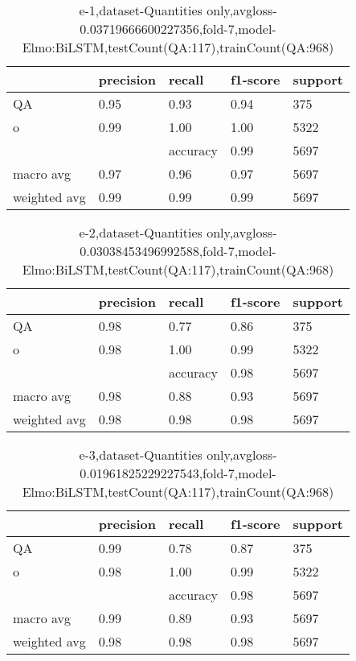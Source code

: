 \begin{table}[!ht] 
\centering
\caption{e-1,dataset-Quantities only,avgloss-0.03719666600227356,fold-7,model-Elmo:BiLSTM,testCount(QA:117),trainCount(QA:968)}\label{e-1data-quantS.tsv}
\begin{tabularx}{300pt}{|X|X|X|X|X|}
\hline
&precision&recall&f1-score&support\\
\hline
QA&0.95&0.93&0.94&375\\
\hline
o&0.99&1.00&1.00&5322\\
\hline
&&accuracy&0.99&5697\\
\hline
macro avg&0.97&0.96&0.97&5697\\
\hline
weighted avg&0.99&0.99&0.99&5697\\
\hline
\end{tabularx}
\end{table}
\begin{table}[!ht] 
\centering
\caption{e-2,dataset-Quantities only,avgloss-0.03038453496992588,fold-7,model-Elmo:BiLSTM,testCount(QA:117),trainCount(QA:968)}\label{e-2data-quantS.tsv}
\begin{tabularx}{300pt}{|X|X|X|X|X|}
\hline
&precision&recall&f1-score&support\\
\hline
QA&0.98&0.77&0.86&375\\
\hline
o&0.98&1.00&0.99&5322\\
\hline
&&accuracy&0.98&5697\\
\hline
macro avg&0.98&0.88&0.93&5697\\
\hline
weighted avg&0.98&0.98&0.98&5697\\
\hline
\end{tabularx}
\end{table}
\begin{table}[!ht] 
\centering
\caption{e-3,dataset-Quantities only,avgloss-0.01961825229227543,fold-7,model-Elmo:BiLSTM,testCount(QA:117),trainCount(QA:968)}\label{e-3data-quantS.tsv}
\begin{tabularx}{300pt}{|X|X|X|X|X|}
\hline
&precision&recall&f1-score&support\\
\hline
QA&0.99&0.78&0.87&375\\
\hline
o&0.98&1.00&0.99&5322\\
\hline
&&accuracy&0.98&5697\\
\hline
macro avg&0.99&0.89&0.93&5697\\
\hline
weighted avg&0.98&0.98&0.98&5697\\
\hline
\end{tabularx}
\end{table}
